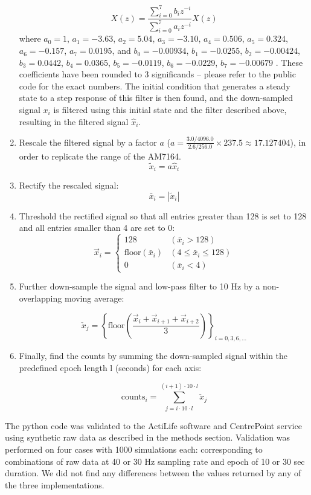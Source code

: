 \documentclass{bmcart}
\begin{document}
\begin{enumerate}
{	$$\hat{X}(z)=\frac{\sum_{i=0}^{7}b_iz^{-i}}{\sum_{i=0}^{7}a_iz^{-i}}X(z)$$
	where $a_0=1$,	$a_1=-3.63$, $a_2=5.04$, $a_3=-3.10$, $a_4=0.506$,
	$a_5=0.324$, $a_6=-0.157$, $a_7=0.0195$, and $b_0=-0.00934$, $b_1=-0.0255$,
	$b_2=-0.00424$, $b_3=0.0442$, $b_4=0.0365$, $b_5=-0.0119$, $b_6=-0.0229$,
	$b_7=-0.00679$ \cite{tryon_fully_1996}. These coefficients have been rounded to
	3 significands – please refer to the public code for the exact numbers. The
	initial condition that generates a steady state to a step response of this
	filter is then found, and the down-sampled signal $x_i$ is filtered using this
	initial state and the filter described above, resulting in the filtered signal
	$\hat{x}_i$.}
	\item{Rescale the filtered signal by a factor $a$ ($a=\frac{3.0 /
			    4096.0}{2.6 / 256.0} \times 237.5 \approx 17.127404$), in order
	            to replicate the range of the AM7164.
	            $$\tilde{x}_i=a\hat{x}_i$$}
	\item{Rectify the rescaled signal: $$\bar{x}_i =|\tilde{x}_i|$$}
	\item{Threshold the rectified signal so that all entries greater than
	            128 is set to 128 and all entries smaller than 4 are set to 0:
	            \[
		            \overrightarrow{x}_i = \begin{cases}
			            128                       & (\bar{x}_i>128)
			            \\
			            \textrm{floor}(\bar{x}_i) &
			            (4\leq\bar{x}_i\leq128)                           \\
			            0                         & (\bar{x}_i<4)
		            \end{cases}
	            \]
	      }
	\item{Further down-sample the signal and low-pass filter to 10 Hz by a
	non-overlapping moving average:

	$$\check{x}_j=\left\{\textrm{floor}(\frac{\overrightarrow{x}_i+\overrightarrow{
				x}_{i+1}+\overrightarrow{x}_{i+2}}{3})\right\}_{i=0,3,6,\ldots}$$
	}
	\item{Finally, find the counts by summing the down-sampled signal
	            within the predefined epoch length l (seconds) for each axis:

	            $$\textrm{counts}_i=\sum_{j=i\cdot10\cdot l}^{(i+1)\cdot10\cdot l}\check{x}_j$$}

\end{enumerate}

The python code was validated to the ActiLife software and CentrePoint service
using synthetic raw data as described in the methods section. Validation was
performed on four cases with 1000 simulations each: corresponding to
combinations of raw data at 40 or 30 Hz sampling rate and epoch of 10 or 30 sec
duration. We did not find any differences between the values returned by any of
the three implementations.
\end{document}
